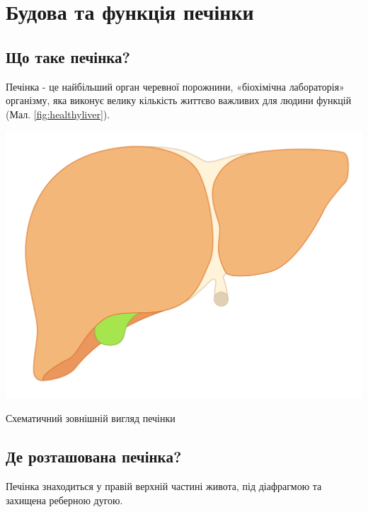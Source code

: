 \chapter{Будова та функція печінки}

\section{Що таке печінка?}

Печінка - це найбільший орган черевної порожнини, «біохімічна лабораторія» організму, яка виконує велику кількість життєво важливих для людини функцій (Мал. \ref{fig:healthyliver}).



\begin{marginfigure}%
  \includegraphics[width=\linewidth]{Figures/HealsyLiver.png}
  \caption{Схематичний зовнішній вигляд печінки}
  \label{fig:healthyliver}
\end{marginfigure}

\section{Де розташована печінка?}

Печінка знаходиться у правій верхній частині живота, під діафрагмою та захищена реберною дугою. 

